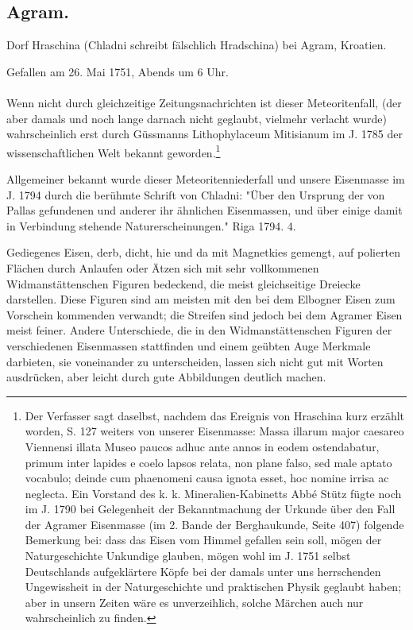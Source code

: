 \documentclass[a4paper, 11pt, oneside, polutonikogreek, german]{article}
\begin{document}
\subsection{Agram.}
\begin{center}
\small
Dorf Hraschina (Chladni schreibt fälschlich Hradschina) bei Agram, Kroatien.

Gefallen am 26. Mai 1751, Abends um 6 Uhr.
\end{center}
\paragraph{}
Wenn nicht durch gleichzeitige Zeitungsnachrichten ist dieser Meteoritenfall, (der aber damals und noch lange darnach nicht geglaubt, vielmehr verlacht wurde) wahrscheinlich erst durch Güssmanns Lithophylaceum Mitisianum im J. 1785 der wissenschaftlichen Welt bekannt geworden.\footnote{Der Verfasser sagt daselbst, nachdem das Ereignis von Hraschina kurz erzählt worden, S. 127 weiters von unserer Eisenmasse: Massa illarum major caesareo Viennensi illata Museo paucos adhuc ante annos in eodem ostendabatur, primum inter lapides e coelo lapsos relata, non plane falso, sed male aptato vocabulo; deinde cum phaenomeni causa ignota esset, hoc nomine irrisa ac neglecta. Ein Vorstand des k. k. Mineralien-Kabinetts Abbé Stütz fügte noch im J. 1790 bei Gelegenheit der Bekanntmachung der Urkunde über den Fall der Agramer Eisenmasse (im 2. Bande der Berghaukunde, Seite 407) folgende Bemerkung bei: dass das Eisen vom Himmel gefallen sein soll, mögen der Naturgeschichte Unkundige glauben, mögen wohl im J. 1751 selbst Deutschlands aufgeklärtere Köpfe bei der damals unter uns herrschenden Ungewissheit in der Naturgeschichte und praktischen Physik geglaubt haben; aber in unsern Zeiten wäre es unverzeihlich, solche Märchen auch nur wahrscheinlich zu finden.}

Allgemeiner bekannt wurde dieser Meteoritenniederfall und unsere Eisenmasse im J. 1794 durch die berühmte Schrift von Chladni: "Über den Ursprung der von Pallas gefundenen und anderer ihr ähnlichen Eisenmassen, und über einige damit in Verbindung stehende Naturerscheinungen." Riga 1794. 4.

Gediegenes Eisen, derb, dicht, hie und da mit Magnetkies gemengt, auf polierten Flächen durch Anlaufen oder Ätzen sich mit sehr vollkommenen Widmanstättenschen Figuren bedeckend, die meist gleichseitige Dreiecke darstellen. Diese Figuren sind am meisten mit den bei dem Elbogner Eisen zum Vorschein kommenden verwandt; die Streifen sind jedoch bei dem Agramer Eisen meist feiner. Andere Unterschiede, die in den Widmanstättenschen Figuren der verschiedenen Eisenmassen stattfinden und einem geübten Auge Merkmale darbieten, sie voneinander zu unterscheiden, lassen sich nicht gut mit Worten ausdrücken, aber leicht durch gute Abbildungen deutlich machen.
\end{document}
